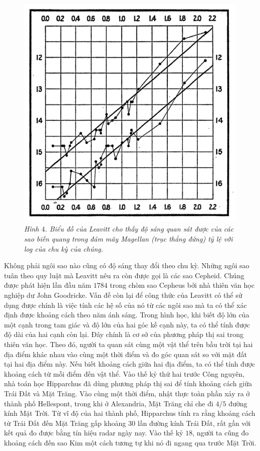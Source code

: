 \begin{multicols}{2}
\begin{figure}[H]
		\includegraphics[width= 1\linewidth]{5}
		\caption{\small\textit{\color{timhieukhoahoc}Hình $4$. Biểu đồ của Leavitt cho thấy độ sáng quan sát được của các sao biến quang trong đám mây Magellan (trục thẳng đứng) tỷ lệ với log của chu kỳ của chúng.}}
		\vspace*{-10pt}
	\end{figure}
	Không phải ngôi sao nào cũng có độ sáng thay đổi theo chu kỳ. Những ngôi sao tuân theo quy luật mà Leavitt nêu ra còn được gọi là các sao Cepheid. Chúng được phát hiện lần đầu năm $1784$ trong chòm sao Cepheus bởi nhà thiên văn học nghiệp dư John Goodricke. Vấn đề còn lại để công thức của Leavitt có thể sử dụng được chính là việc tính các hệ số của nó từ các ngôi sao mà ta có thể xác định được khoảng cách theo năm ánh sáng.
	\vskip 0.1cm
	Trong hình học, khi biết độ lớn của một cạnh trong tam giác và độ lớn của hai góc kề cạnh này, ta có thể tính được độ dài của hai cạnh còn lại. Đây chính là cơ sở của phương pháp thị sai trong thiên văn học. Theo đó, người ta quan sát cùng một vật thể trên bầu trời tại hai địa điểm khác nhau vào cùng một thời điểm và đo góc quan sát so với mặt đất tại hai địa điểm này. Nếu biết khoảng cách giữa hai địa điểm, ta có thể tính được khoảng cách từ mỗi điểm đến vật thể.
	\vskip 0.1cm
	Vào thế kỷ thứ hai trước Công nguyên, nhà toán học Hipparchus đã dùng phương pháp thị sai để tính khoảng cách giữa Trái Đất và Mặt Trăng. Vào cùng một thời điểm, nhật thực toàn phần xảy ra ở thành phố Hellespont, trong khi ở Alexandria, Mặt Trăng chỉ che đi $4/5$ đường kính Mặt Trời. Từ vĩ độ của hai thành phố, Hipparchus tính ra rằng khoảng cách từ Trái Đất đến Mặt Trăng gấp khoảng $30$ lần đường kính Trái Đất, rất gần với kết quả đo được bằng tín hiệu radar ngày nay. Vào thế kỷ $18$, người ta cũng đo khoảng cách đến sao Kim một cách tương tự khi nó đi ngang qua trước Mặt Trời.

\end{multicols}
